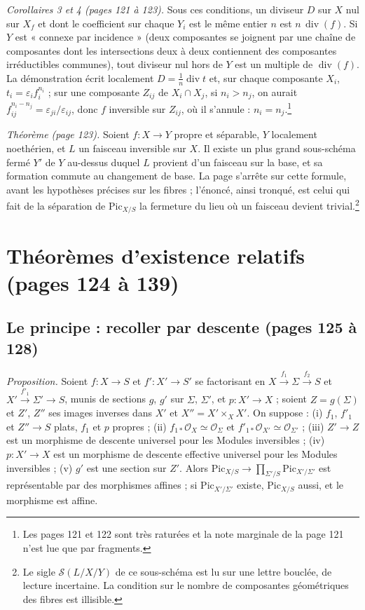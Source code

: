 \documentclass[11pt,a4paper]{article}
\begin{document}
\emph{Corollaires 3 et 4 (pages 121 à 123).} Sous ces conditions, un diviseur
$D$ sur $X$ nul sur $X_f$ et dont le coefficient sur chaque $Y_i$ est le même
entier $n$ est $n\,\operatorname{div}(f)$. Si $Y$ est « connexe par incidence »
(deux composantes se joignent par une chaîne de composantes dont les
intersections deux à deux contiennent des composantes irréductibles communes),
tout diviseur nul hors de $Y$ est un multiple de $\operatorname{div}(f)$.
La démonstration écrit localement $D = \frac1n \operatorname{div} t$ et, sur
chaque composante $X_i$, $t_i = \varepsilon_i f_i^{n_i}$ ; sur une composante
$Z_{ij}$ de $X_i \cap X_j$, si $n_i > n_j$, on aurait
$f_{ij}^{n_i - n_j} = \varepsilon_{ji}/\varepsilon_{ij}$, donc $f$ inversible
sur $Z_{ij}$, où il s'annule : $n_i = n_j$.\footnote{Les pages 121 et 122 sont
très raturées et la note marginale de la page 121 n'est lue que par
fragments.}

\emph{Théorème (page 123).} Soient $f \colon X \to Y$ propre et séparable,
$Y$ localement noethérien, et $L$ un faisceau inversible sur $X$. Il existe un
plus grand sous-schéma fermé $Y'$ de $Y$ au-dessus duquel $L$ provient d'un
faisceau sur la base, et sa formation commute au changement de base. La page
s'arrête sur cette formule, avant les hypothèses précises sur les fibres ;
l'énoncé, ainsi tronqué, est celui qui fait de la séparation de
$\mathrm{Pic}_{X/S}$ la fermeture du lieu où un faisceau devient
trivial.\footnote{Le sigle $\mathcal{S}(L/X/Y)$ de ce sous-schéma est lu sur
une lettre bouclée, de lecture incertaine. La condition sur le nombre de
composantes géométriques des fibres est illisible.}

\section*{Théorèmes d'existence relatifs (pages 124 à 139)}

\subsection*{Le principe : recoller par descente (pages 125 à 128)}

\emph{Proposition.} Soient $f \colon X \to S$ et $f' \colon X' \to S'$ se
factorisant en $X \xrightarrow{f_1} \Sigma \xrightarrow{f_2} S$ et
$X' \xrightarrow{f'_1} \Sigma' \to S$, munis de sections $g$, $g'$ sur $\Sigma$,
$\Sigma'$, et $p \colon X' \to X$ ; soient $Z = g(\Sigma)$ et $Z'$, $Z''$ ses
images inverses dans $X'$ et $X'' = X' \times_X X'$. On suppose : (i) $f_1$,
$f'_1$ et $Z'' \to S$ plats, $f_1$ et $p$ propres ; (ii)
$f_{1*}\mathcal{O}_X \simeq \mathcal{O}_\Sigma$ et
$f'_{1*}\mathcal{O}_{X'} \simeq \mathcal{O}_{\Sigma'}$ ; (iii) $Z' \to Z$ est un
morphisme de descente universel pour les Modules inversibles ; (iv)
$p \colon X' \to X$ est un morphisme de descente effective universel pour les
Modules inversibles ; (v) $g'$ est une section sur $Z'$. Alors
$\mathrm{Pic}_{X/S} \to \prod_{\Sigma'/S}\mathrm{Pic}_{X'/\Sigma'}$ est
représentable par des morphismes affines ; si $\mathrm{Pic}_{X'/\Sigma'}$
existe, $\mathrm{Pic}_{X/S}$ aussi, et le morphisme est affine.
\end{document}

